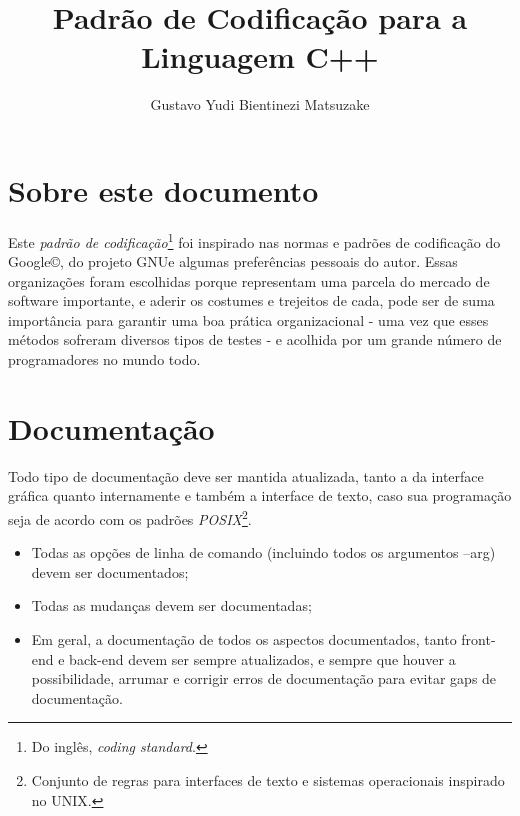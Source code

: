 \documentclass{article}
\begin{document}
\title{Padrão de Codificação para a Linguagem C++}
\author{Gustavo Yudi Bientinezi Matsuzake}
\maketitle



\section{Sobre este documento}

Este \emph{padrão de codificação}\footnote{Do inglês, \emph{coding standard}.} foi inspirado nas normas e padrões de codificação do Google\copyright, do projeto GNU\textcopyleft e algumas preferências pessoais do autor. Essas organizações foram escolhidas porque representam uma parcela do mercado de software importante, e aderir os costumes e trejeitos de cada, pode ser de suma importância para garantir uma boa prática organizacional - uma vez que esses métodos sofreram diversos tipos de testes - e acolhida por um grande número de programadores no mundo todo.

\section{Documentação}

Todo tipo de documentação deve ser mantida atualizada, tanto a da interface gráfica quanto internamente e também a interface de texto, caso sua programação seja de acordo com os padrões \emph{POSIX}\footnote{Conjunto de regras para interfaces de texto e sistemas operacionais inspirado no UNIX.}.

\begin{itemize}
\item Todas as opções de linha de comando (incluindo todos os argumentos --arg) devem ser documentados;
\item Todas as mudanças devem ser documentadas;
\item Em geral, a documentação de todos os aspectos documentados, tanto front-end e back-end devem ser sempre atualizados, e sempre que houver a possibilidade, arrumar e corrigir erros de documentação para evitar gaps de documentação.
\end{itemize}
\end{document}
